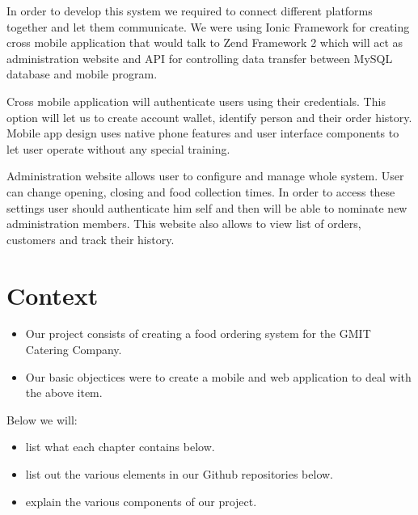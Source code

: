 



In order to develop this system we required to connect different platforms together and let them communicate. We were using Ionic Framework for creating cross mobile application that would talk to Zend Framework 2 which will act as administration website and API for controlling data transfer between MySQL database and mobile program.

Cross mobile application will authenticate users using their credentials. This option will let us to create account wallet, identify person and their order history. Mobile app design uses native phone features and user interface components to let user operate without any special training.

Administration website allows user to configure and manage whole system. User can change opening, closing and food collection times. In order to access these settings user should authenticate him self and then will be able to nominate new administration members. This website also allows to view list of orders, customers and track their history.  



\chapter{Context}	%

\begin{itemize}
\item Our project consists of creating a food ordering system for the GMIT Catering Company.
\item Our basic objectices were to create a mobile and web application to deal with the above item.
\end{itemize}

Below we will:
\begin{itemize}
\item list what each chapter contains below.
\item list out the various elements in our Github repositories below.
\item explain the various components of our project.
\end{itemize}

